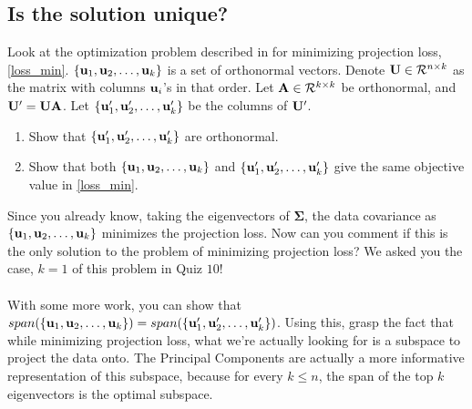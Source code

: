 \subsection{Is the solution unique?}
Look at the optimization problem described in  for minimizing projection loss, \autoref{loss_min}. $\{\mathbf{u}_1, \mathbf{u}_2,\dots, \mathbf{u}_k\}$ is a set of orthonormal vectors. Denote $\mathbf{U} \in \mathcal{R}^{n \times k}$ as the matrix with columns $\mathbf{u}_i$'s in that order. Let $\mathbf{A} \in \mathcal{R}^{k \times k}$ be orthonormal, and $\mathbf{U}' = \mathbf{U} \mathbf{A}$. Let $\{\mathbf{u}'_1, \mathbf{u}'_2,\dots, \mathbf{u}'_k\}$ be the columns of $\mathbf{U}'$. 
\begin{enumerate}[label=\alph*)]
\item Show that $\{\mathbf{u}'_1, \mathbf{u}'_2,\dots, \mathbf{u}'_k\}$ are orthonormal.
\item Show that both $\{\mathbf{u}_1, \mathbf{u}_2,\dots, \mathbf{u}_k\}$ and $\{\mathbf{u}'_1, \mathbf{u}'_2,\dots, \mathbf{u}'_k\}$ give the same objective value in \autoref{loss_min}.
\end{enumerate}
Since you already know, taking the eigenvectors of $\mathbf{\Sigma}$, the data covariance as $\{\mathbf{u}_1, \mathbf{u}_2,\dots, \mathbf{u}_k\}$ minimizes the projection loss. Now can you comment if this is the only solution to the problem of minimizing projection loss? We asked you the case, $k = 1$ of this problem in Quiz $10$!\\\\
With some more work, you can show that $span(\{\mathbf{u}_1, \mathbf{u}_2,\dots, \mathbf{u}_k\}) = span(\{\mathbf{u}'_1, \mathbf{u}'_2,\dots, \mathbf{u}'_k\})$. Using this, grasp the fact that while minimizing projection loss, what we're actually looking for is a subspace to project the data onto. The Principal Components are actually a more informative representation of this subspace, because for every $k \leq n$, the span of the top $k$ eigenvectors is the optimal subspace.
